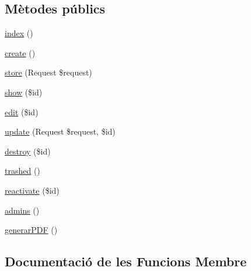 \subsection*{Mètodes públics}
\begin{DoxyCompactItemize}
\item 
\mbox{\hyperlink{class_app_1_1_http_1_1_controllers_1_1_empleats_controller_a149eb92716c1084a935e04a8d95f7347}{index}} ()
\item 
\mbox{\hyperlink{class_app_1_1_http_1_1_controllers_1_1_empleats_controller_a435e7d7525d4bcd0ed5e34a469f3adf6}{create}} ()
\item 
\mbox{\hyperlink{class_app_1_1_http_1_1_controllers_1_1_empleats_controller_a9ef485163104597c12185b53cdacf638}{store}} (Request \$request)
\item 
\mbox{\hyperlink{class_app_1_1_http_1_1_controllers_1_1_empleats_controller_ae4914d07a9bbe4aede7a5dea759f6287}{show}} (\$id)
\item 
\mbox{\hyperlink{class_app_1_1_http_1_1_controllers_1_1_empleats_controller_a459ed16587e3a50b39b672c7e473abc5}{edit}} (\$id)
\item 
\mbox{\hyperlink{class_app_1_1_http_1_1_controllers_1_1_empleats_controller_affb03cc19897a1800a0f411264d6c7cc}{update}} (Request \$request, \$id)
\item 
\mbox{\hyperlink{class_app_1_1_http_1_1_controllers_1_1_empleats_controller_a726fa8a4b4b187b9ca32ba427aac8137}{destroy}} (\$id)
\item 
\mbox{\hyperlink{class_app_1_1_http_1_1_controllers_1_1_empleats_controller_a27e5c7c270aebe0baec29a042d450df4}{trashed}} ()
\item 
\mbox{\hyperlink{class_app_1_1_http_1_1_controllers_1_1_empleats_controller_a796ea4077bb7fe14af9f92e4ed083556}{reactivate}} (\$id)
\item 
\mbox{\hyperlink{class_app_1_1_http_1_1_controllers_1_1_empleats_controller_a078272765f603742eaf0ec39b2ec5596}{admins}} ()
\item 
\mbox{\hyperlink{class_app_1_1_http_1_1_controllers_1_1_empleats_controller_a3fb43ccec4eb67c487c799e63e78ebdc}{generar\+P\+DF}} ()
\end{DoxyCompactItemize}


\subsection{Documentació de les Funcions Membre}
\mbox{\label{class_app_1_1_http_1_1_controllers_1_1_empleats_controller_a078272765f603742eaf0ec39b2ec5596}} 
